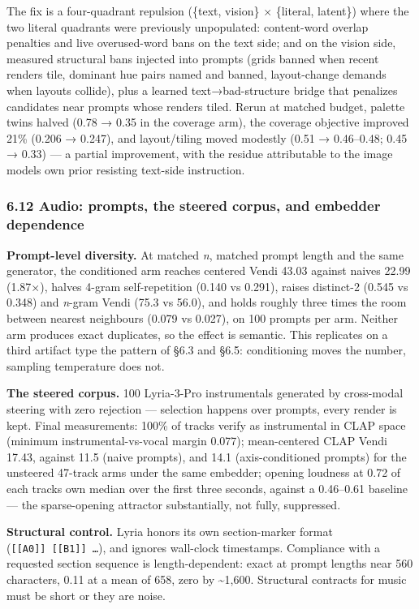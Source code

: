 \documentclass[
  11pt,
]{article}
\theoremstyle{plain}
\theoremstyle{definition}
\begin{document}
The fix is a four-quadrant repulsion (\{text, vision\} × \{literal,
latent\}) where the two literal quadrants were previously unpopulated:
content-word overlap penalties and live overused-word bans on the text
side; and on the vision side, measured structural bans injected into
prompts (grids banned when recent renders tile, dominant hue pairs named
and banned, layout-change demands when layouts collide), plus a learned
text→bad-structure bridge that penalizes candidates near prompts whose
renders tiled. Rerun at matched budget, palette twins halved (0.78 →
0.35 in the coverage arm), the coverage objective improved 21\% (0.206 →
0.247), and layout/tiling moved modestly (0.51 → 0.46--0.48; 0.45 →
0.33) --- a partial improvement, with the residue attributable to the
image model\textquotesingle s own prior resisting text-side instruction.

\subsubsection{6.12 Audio: prompts, the steered corpus, and embedder
dependence}\label{612-audio-prompts-the-steered-corpus-and-embedder-dependence}

\textbf{Prompt-level diversity.} At matched \emph{n}, matched prompt
length and the same generator, the conditioned arm reaches centered
Vendi 43.03 against naive\textquotesingle s 22.99 (1.87×), halves 4-gram
self-repetition (0.140 vs 0.291), raises distinct-2 (0.545 vs 0.348) and
\emph{n}-gram Vendi (75.3 vs 56.0), and holds roughly three times the
room between nearest neighbours (0.079 vs 0.027), on 100 prompts per
arm. Neither arm produces exact duplicates, so the effect is semantic.
This replicates on a third artifact type the pattern of §6.3 and §6.5:
conditioning moves the number, sampling temperature does not.

\textbf{The steered corpus.} 100 Lyria-3-Pro instrumentals generated by
cross-modal steering with zero rejection --- selection happens over
prompts, every render is kept. Final measurements: 100\% of tracks
verify as instrumental in CLAP space (minimum instrumental-vs-vocal
margin 0.077); mean-centered CLAP Vendi 17.43, against 11.5 (naive
prompts), and 14.1 (axis-conditioned prompts) for the unsteered 47-track
arms under the same embedder; opening loudness at 0.72 of each
track\textquotesingle s own median over the first three seconds, against
a 0.46--0.61 baseline --- the sparse-opening attractor substantially,
not fully, suppressed.

\textbf{Structural control.} Lyria honors its own section-marker format
(\texttt{{[}{[}A0{]}{]}\ {[}{[}B1{]}{]}\ …}), and ignores wall-clock
timestamps. Compliance with a requested section sequence is
length-dependent: exact at prompt lengths near 560 characters, 0.11 at a
mean of 658, zero by \textasciitilde1,600. Structural contracts for
music must be short or they are noise.
\end{document}
